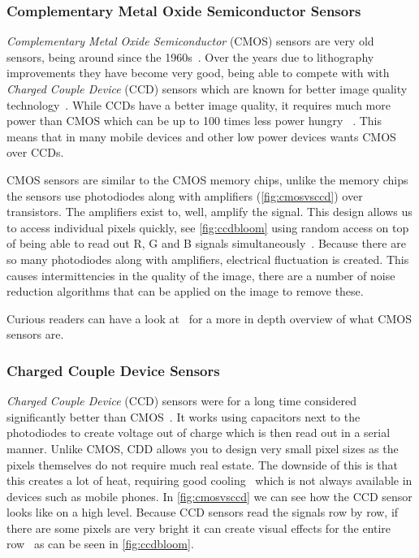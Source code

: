 \subsubsection{Complementary Metal Oxide Semiconductor Sensors}
\textit{Complementary Metal Oxide Semiconductor} (CMOS) sensors are very old
sensors, being around since the 1960s~\cite{ieeeCMOS}. Over the years due to
lithography improvements they have become very good, being able to compete with
with \textit{Charged Couple Device} (CCD) sensors which are known for better
image quality technology~\cite{ieeeCMOS}. While CCDs have a better image quality, it requires
much more power than CMOS which can be up to 100 times less power hungry~ \cite{CMOSReview}.
This means that in many mobile devices and other low power
devices wants CMOS over CCDs.

CMOS sensors are similar to the CMOS memory chips, unlike the memory chips the
sensors use photodiodes along with amplifiers (\cref{fig:cmosvsccd}) over
transistors. The amplifiers exist to, well, amplify the signal. This design
allows us to access individual pixels quickly, see \cref{fig:ccdbloom} using
random access on top of being able to read out R, G and B signals
simultaneously~\cite{cmosAlen}. Because there are so many photodiodes along
with amplifiers, electrical fluctuation is created. This causes intermittencies
in the quality of the image, there are a number of noise reduction algorithms
that can be applied on the image to remove these.

Curious readers can have a look at~\cite{CMOSReview, ieeeCMOS} for a more
in depth overview of what CMOS sensors are.

\subsubsection{Charged Couple Device Sensors}
\textit{Charged Couple Device} (CCD) sensors were for a long time considered
significantly better than CMOS~\cite{ieeeCMOS}. It works using capacitors next
to the photodiodes to create voltage out of charge which is then read out in a
serial manner. Unlike CMOS, CDD allows you to design very small pixel sizes as
the pixels themselves do not require much real estate. The downside of this is
that this creates a lot of heat, requiring good cooling~\cite{meng2016numerical}
which is not always available in devices such as mobile phones. In
\cref{fig:cmosvsccd} we can see how the CCD sensor looks like on a high level.
Because CCD sensors read the signals row by row, if there are some pixels are
very bright it can create visual effects for the entire row~\cite{ieeeCMOS} as
can be seen in \cref{fig:ccdbloom}.


